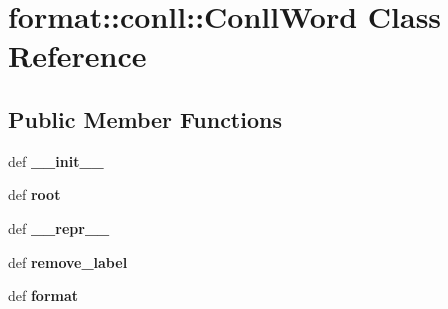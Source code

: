 \hypertarget{classformat_1_1conll_1_1ConllWord}{
\section{format::conll::ConllWord Class Reference}
\label{classformat_1_1conll_1_1ConllWord}
}
\subsection*{Public Member Functions}
\begin{DoxyCompactItemize}
\item 
\hypertarget{classformat_1_1conll_1_1ConllWord_ad06b3bcfab12767e82c5ae7d8826fe7e}{
def {\bfseries \_\-\_\-init\_\-\_\-}}
\label{classformat_1_1conll_1_1ConllWord_ad06b3bcfab12767e82c5ae7d8826fe7e}

\item 
\hypertarget{classformat_1_1conll_1_1ConllWord_a8ffcacf4c8fac736f7ebd9a0eca9c40a}{
def {\bfseries root}}
\label{classformat_1_1conll_1_1ConllWord_a8ffcacf4c8fac736f7ebd9a0eca9c40a}

\item 
\hypertarget{classformat_1_1conll_1_1ConllWord_aba1e6a4093a27dc968183b65ef983e16}{
def {\bfseries \_\-\_\-repr\_\-\_\-}}
\label{classformat_1_1conll_1_1ConllWord_aba1e6a4093a27dc968183b65ef983e16}

\item 
\hypertarget{classformat_1_1conll_1_1ConllWord_ac03ffeb2276d80ada75187b8db8a5ef7}{
def {\bfseries remove\_\-label}}
\label{classformat_1_1conll_1_1ConllWord_ac03ffeb2276d80ada75187b8db8a5ef7}

\item 
\hypertarget{classformat_1_1conll_1_1ConllWord_a981cd2b5097e89490160bf84fe47be2b}{
def {\bfseries format}}
\label{classformat_1_1conll_1_1ConllWord_a981cd2b5097e89490160bf84fe47be2b}

\end{DoxyCompactItemize}
